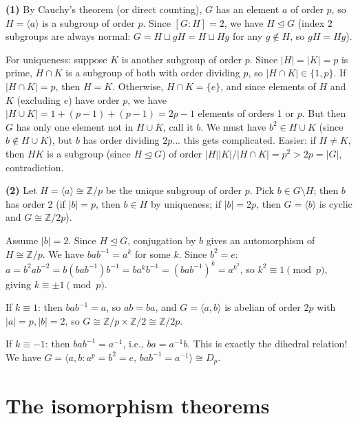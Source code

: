 \documentclass{report}
\begin{document}
\begin{solution}
\textbf{(1)} By Cauchy's theorem (or direct counting), \(G\) has an element \(a\) of order \(p\), so \(H = \langle a \rangle\) is a subgroup of order \(p\). Since \([G:H] = 2\), we have \(H \trianglelefteq G\) (index 2 subgroups are always normal: \(G = H \sqcup gH = H \sqcup Hg\) for any \(g \notin H\), so \(gH = Hg\)).

For uniqueness: suppose \(K\) is another subgroup of order \(p\). Since \(|H| = |K| = p\) is prime, \(H \cap K\) is a subgroup of both with order dividing \(p\), so \(|H \cap K| \in \{1, p\}\). If \(|H \cap K| = p\), then \(H = K\). Otherwise, \(H \cap K = \{e\}\), and since elements of \(H\) and \(K\) (excluding \(e\)) have order \(p\), we have \(|H \cup K| = 1 + (p-1) + (p-1) = 2p - 1\) elements of orders 1 or \(p\). But then \(G\) has only one element not in \(H \cup K\), call it \(b\). We must have \(b^2 \in H \cup K\) (since \(b \notin H \cup K\)), but \(b\) has order dividing \(2p\)... this gets complicated. Easier: if \(H \neq K\), then \(HK\) is a subgroup (since \(H \trianglelefteq G\)) of order \(|H||K|/|H \cap K| = p^2 > 2p = |G|\), contradiction.

\textbf{(2)} Let \(H = \langle a \rangle \cong \mathbb{Z}/p\) be the unique subgroup of order \(p\). Pick \(b \in G \setminus H\); then \(b\) has order 2 (if \(|b| = p\), then \(b \in H\) by uniqueness; if \(|b| = 2p\), then \(G = \langle b \rangle\) is cyclic and \(G \cong \mathbb{Z}/2p\)).

Assume \(|b| = 2\). Since \(H \trianglelefteq G\), conjugation by \(b\) gives an automorphism of \(H \cong \mathbb{Z}/p\). We have \(bab^{-1} = a^k\) for some \(k\). Since \(b^2 = e\): \(a = b^2 a b^{-2} = b(bab^{-1})b^{-1} = ba^kb^{-1} = (bab^{-1})^k = a^{k^2}\), so \(k^2 \equiv 1 \pmod{p}\), giving \(k \equiv \pm 1 \pmod{p}\).

If \(k \equiv 1\): then \(bab^{-1} = a\), so \(ab = ba\), and \(G = \langle a, b \rangle\) is abelian of order \(2p\) with \(|a| = p, |b| = 2\), so \(G \cong \mathbb{Z}/p \times \mathbb{Z}/2 \cong \mathbb{Z}/2p\).

If \(k \equiv -1\): then \(bab^{-1} = a^{-1}\), i.e., \(ba = a^{-1}b\). This is exactly the dihedral relation! We have \(G = \langle a, b : a^p = b^2 = e, \, bab^{-1} = a^{-1} \rangle \cong D_p\).
\end{solution}

\section{The isomorphism theorems}
\end{document}

